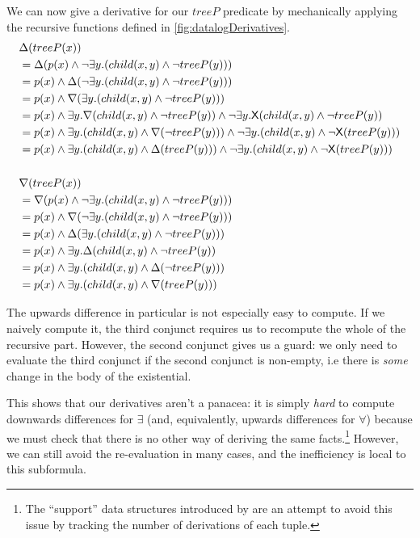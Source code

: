 We can now give a derivative for our $treeP$ predicate by mechanically applying
the recursive functions defined in \cref{fig:datalogDerivatives}.
\begin{align*}
  &\Delta(treeP(x))\\
  &= \Delta(p(x) \wedge \neg \exists y. (child(x, y) \wedge \neg treeP(y)))\\
  &= p(x) \wedge \Delta(\neg \exists y. (child(x, y) \wedge \neg treeP(y)))\\
  &= p(x) \wedge \nabla(\exists y. (child(x, y) \wedge \neg treeP(y)))\\
  &= p(x) \wedge \exists y. \nabla(child(x, y) \wedge \neg treeP(y)) \wedge \neg \exists y. {\mathsf X}(child(x,y) \wedge \neg treeP(y))\\
  &= p(x) \wedge \exists y. (child(x, y) \wedge \nabla(\neg treeP(y))) \wedge \neg \exists y. (child(x,y) \wedge \neg {\mathsf X}(treeP(y)))\\
  &= p(x) \wedge \exists y. (child(x, y) \wedge \Delta(treeP(y))) \wedge \neg \exists y. (child(x,y) \wedge \neg {\mathsf X}(treeP(y)))\\
  \\
  &\nabla(treeP(x))\\
  &= \nabla(p(x) \wedge \neg \exists y. (child(x, y) \wedge \neg treeP(y)))\\
  &= p(x) \wedge \nabla(\neg \exists y. (child(x, y) \wedge \neg treeP(y)))\\
  &= p(x) \wedge \Delta(\exists y. (child(x, y) \wedge \neg treeP(y)))\\
  &= p(x) \wedge \exists y. \Delta(child(x, y) \wedge \neg treeP(y))\\
  &= p(x) \wedge \exists y. (child(x, y) \wedge \Delta(\neg treeP(y)))\\
  &= p(x) \wedge \exists y. (child(x, y) \wedge \nabla(treeP(y)))
\end{align*}

The upwards difference in particular is not especially easy to compute. If we naively compute it, the
third conjunct requires us to recompute the whole of the recursive part. However,
the second conjunct gives us a
guard: we only need to evaluate the third conjunct if the second conjunct is
non-empty, i.e there is \emph{some} change in the body of the existential.

This shows that our derivatives aren't a panacea: it is simply \emph{hard} to compute
downwards differences for $\exists$ (and, equivalently, upwards differences for
$\forall$) because we must check that there is no other way of deriving the same
facts.\footnote{The ``support'' data structures introduced by
  \autocite{gupta1993maintaining} are an attempt to avoid this issue by
  tracking the number of derivations of each tuple.} However, we can still avoid
the re-evaluation in many cases, and the inefficiency is local to this subformula.

